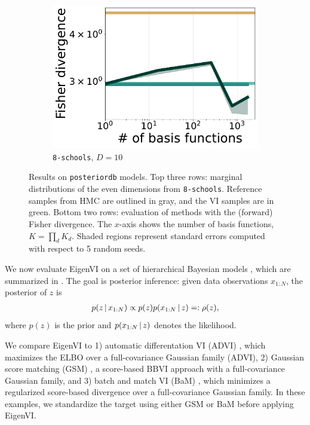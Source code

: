 \begin{figure}[t]
\begin{subfigure}[b]{0.245\linewidth}
        \includegraphics[scale=0.205]{figs/expts-pdb/PDB_85_scores_noflow.pdf}
    \caption{\texttt{8-schools}, $D=10$
            }
    \end{subfigure}
\caption{Results on \texttt{posteriordb} models. Top three rows:
marginal distributions of the even dimensions from \texttt{8-schools}.
Reference samples from HMC are outlined in gray, and
the VI samples are in green.
Bottom two rows: evaluation of methods with the (forward) Fisher divergence.
The $x$-axis shows the number of basis functions, $K\!=\!\prod_{d} K_d$.
Shaded regions represent standard errors computed with respect to 5 random seeds.
}
\label{fig:posteriordb}
\vspace{-10pt}
\end{figure}

We now evaluate EigenVI on a set of hierarchical Bayesian models
\cite{carpenter2017stan,magnusson2022posteriordb,roualdes2023bridgestan},
which are summarized in .
The goal is posterior inference: given data  observations $x_{1:N}$,
the posterior of $z$ is
\begin{align}
p(z \,|\, x_{1:N}) \propto p(z)  p(x_{1:N}\,|\, z) =: \rho(z),
\end{align}
where $p(z)$ is the prior and $p(x_{1:N}\,|\, z)$ denotes the likelihood.

We compare EigenVI to
1) automatic differentation VI (ADVI) \citep{kucukelbir2017automatic}, which maximizes the ELBO over a full-covariance Gaussian family
({ADVI}),
2) Gaussian score matching ({GSM}) \citep{modi2023},
a score-based BBVI approach with a full-covariance Gaussian
    family,
and 3)
batch and match VI ({BaM}) \citep{cai2024}, which minimizes a
regularized score-based divergence over a full-covariance Gaussian
family.
In these examples, we standardize the target using either GSM or BaM
before applying EigenVI.

